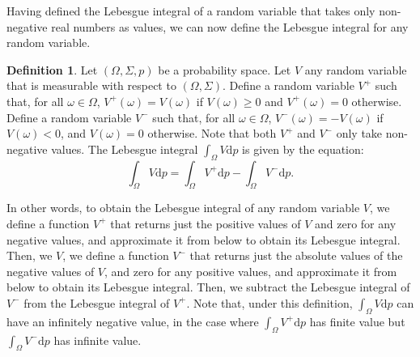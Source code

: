 \documentclass[11pt]{article}
\theoremstyle{definition}
\newtheorem{definition}[theorem]{Definition}
\theoremstyle{remark}
\begin{document}
Having defined the Lebesgue integral of a random variable that takes only non-negative real numbers as values, we can now define the Lebesgue integral for any random variable.
\begin{definition}
    Let $(\Omega,\Sigma,p)$ be a probability space. Let $V$ any random variable that is measurable with respect to $(\Omega,\Sigma)$. Define a random variable $V^{+}$ such that, for all $\omega\in\Omega$, $V^{+}(\omega)=V(\omega)$ if $V(\omega)\geq0$ and $V^{+}(\omega)=0$ otherwise. Define a random variable $V^{-}$ such that, for all $\omega\in\Omega$, $V^{-}(\omega)=-V(\omega)$ if $V(\omega)<0$, and $V(\omega)=0$ otherwise. Note that both $V^{+}$ and $V^{-}$ only take non-negative values. The Lebesgue integral $\int_{\Omega}V\textrm{d}p$ is given by the equation:
    $$\int_{\Omega}V\textrm{d}p = \int_{\Omega}V^{+}\textrm{d}p - \int_{\Omega}V^{-}\textrm{d}p.$$
\end{definition}
\noindent
In other words, to obtain the Lebesgue integral of any random variable $V$, we define a function $V^{+}$ that returns just the positive values of $V$ and zero for any negative values, and approximate it from below to obtain its Lebesgue integral. Then, we $V$, we define a function $V^{-}$ that returns just the absolute values of the negative values of $V$, and zero for any positive values, and approximate it from below to obtain its Lebesgue integral. Then, we subtract the Lebesgue integral of $V^{-}$ from the Lebesgue integral of $V^{+}$. Note that, under this definition, $\int_{\Omega}V\textrm{d}p$ can have an infinitely negative value, in the case where $\int_{\Omega}V^{+}\textrm{d}p$ has finite value but $\int_{\Omega}V^{-}\textrm{d}p$ has infinite value.\par 
\end{document}
